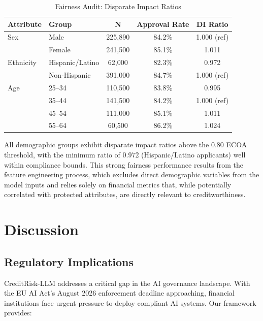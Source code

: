 \documentclass[11pt,a4paper]{article}
\begin{document}
\begin{table}[H]
\centering
\caption{Fairness Audit: Disparate Impact Ratios}
\label{tab:fairness}
\begin{tabular}{llccc}
\toprule
\textbf{Attribute} & \textbf{Group} & \textbf{N} & \textbf{Approval Rate} & \textbf{DI Ratio} \\
\midrule
Sex & Male & 225,890 & 84.2\% & 1.000 (ref) \\
 & Female & 241,500 & 85.1\% & 1.011 \\
\midrule
Ethnicity & Hispanic/Latino & 62,000 & 82.3\% & 0.972 \\
 & Non-Hispanic & 391,000 & 84.7\% & 1.000 (ref) \\
\midrule
Age & 25--34 & 110,500 & 83.8\% & 0.995 \\
 & 35--44 & 141,500 & 84.2\% & 1.000 (ref) \\
 & 45--54 & 111,000 & 85.1\% & 1.011 \\
 & 55--64 & 60,500 & 86.2\% & 1.024 \\
\bottomrule
\end{tabular}
\end{table}

All demographic groups exhibit disparate impact ratios above the 0.80 ECOA threshold, with the minimum ratio of 0.972 (Hispanic/Latino applicants) well within compliance bounds. This strong fairness performance results from the feature engineering process, which excludes direct demographic variables from the model inputs and relies solely on financial metrics that, while potentially correlated with protected attributes, are directly relevant to creditworthiness.

\section{Discussion}\label{sec:discussion}

\subsection{Regulatory Implications}

CreditRisk-LLM addresses a critical gap in the AI governance landscape. With the EU AI Act's August 2026 enforcement deadline approaching, financial institutions face urgent pressure to deploy compliant AI systems. Our framework provides:
\end{document}

